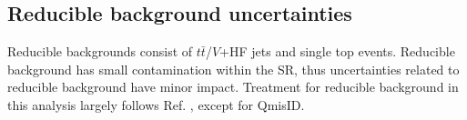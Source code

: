 \documentclass[../thesis.tex]{subfiles}
\begin{document}

\subsection{Reducible background uncertainties}
Reducible backgrounds consist of $t\bar{t}$/$V$+\acs{HF} jets and single top events. Reducible background has small contamination within the \acs{SR}, thus uncertainties related to reducible background have minor impact. Treatment for reducible background in this analysis largely follows Ref. \citep{tttt_obs}, except for \acs{QmisID}.
\end{document}
